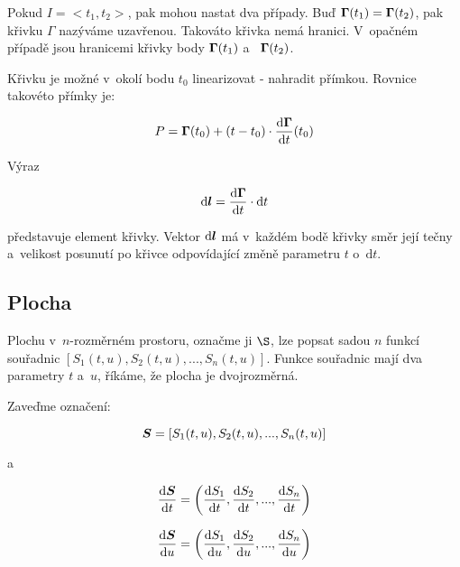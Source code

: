 Pokud \(I = <t_1, t_2>\), pak mohou nastat dva případy. Buď \(\boldsymbol{\Gamma}(t_1) = \boldsymbol{\Gamma}(t_2)\), pak křivku \(\Gamma\) nazýváme uzavřenou. Takováto křivka nemá hranici. V~opačném případě jsou hranicemi křivky body \(\boldsymbol{\Gamma}(t_1)\) a~ \(\boldsymbol{\Gamma}(t_2)\).

Křivku je možné v~okolí bodu \(t_0\) linearizovat - nahradit přímkou. Rovnice takovéto přímky je:

\begin{equation}
P = \boldsymbol{\Gamma}(t_0) + (t - t_0) \cdot \frac{\mathrm{d}\boldsymbol{\Gamma}}{\mathrm{d}t}(t_0)
\end{equation}

Výraz 

\begin{equation}
\mathrm{d}\boldsymbol{l} = \frac{\mathrm{d}\boldsymbol{\Gamma}}{\mathrm{d}t} \cdot \mathrm{d}t 
\end{equation}

představuje element křivky. Vektor \(\mathrm{d}\boldsymbol{l}\) má v~každém bodě křivky směr její tečny a~velikost posunutí po křivce odpovídající změně parametru \(t\) o~\(\mathrm{d}t\).

\subsection{Plocha}

Plochu v~\(n\)-rozměrném prostoru, označme ji \(\S\), lze popsat sadou \(n\) funkcí souřadnic \([S_1(t, u), S_2(t, u), ..., S_n(t, u)]\). Funkce souřadnic mají dva parametry \(t\) a~\(u\), říkáme, že plocha je dvojrozměrná.

Zaveďme označení:

\begin{equation}
\boldsymbol{S} = [S_1(t, u), S_2(t, u), ..., S_n(t, u)]
\end{equation}

a

\begin{equation}
\frac{\mathrm{d}\boldsymbol{S}}{\mathrm{d}t} = \left(\frac{\mathrm{d}S_1}{\mathrm{d}t}, \frac{\mathrm{d}S_2}{\mathrm{d}t}, ..., \frac{\mathrm{d}S_n}{\mathrm{d}t} \right)
\end{equation}

\begin{equation}
\frac{\mathrm{d}\boldsymbol{S}}{\mathrm{d}u} = \left(\frac{\mathrm{d}S_1}{\mathrm{d}u}, \frac{\mathrm{d}S_2}{\mathrm{d}u}, ..., \frac{\mathrm{d}S_n}{\mathrm{d}u} \right)
\end{equation}


